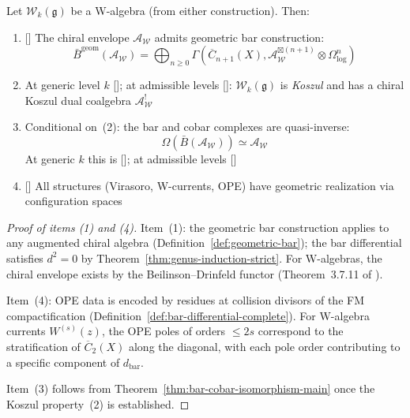 \begin{conjecture}\label{conj:w-algebra-bar-cobar}
Let $\mathcal{W}_k(\mathfrak{g})$ be a W-algebra (from either construction). Then:
\begin{enumerate}
\item \textup{[\ClaimStatusProvedHere]}
The chiral envelope $\mathcal{A}_{\mathcal{W}}$ admits geometric bar
      construction:
      \[\bar{B}^{\text{geom}}(\mathcal{A}_{\mathcal{W}}) = \bigoplus_{n \geq 0}
      \Gamma\left(\overline{C}_{n+1}(X), \mathcal{A}_{\mathcal{W}}^{\boxtimes(n+1)}
      \otimes \Omega^n_{\log}\right)\]

\item At generic level $k$ \textup{[\ClaimStatusProvedHere]};
      at admissible levels \textup{[\ClaimStatusConjectured]}:
      $\mathcal{W}_k(\mathfrak{g})$ is \emph{Koszul} and has a chiral
      Koszul dual coalgebra $\mathcal{A}_{\mathcal{W}}^!$

\item Conditional on~\textup{(2)}: the bar and cobar complexes are quasi-inverse:
      \[\Omega(\bar{B}(\mathcal{A}_{\mathcal{W}})) \simeq \mathcal{A}_{\mathcal{W}}\]
      At generic $k$ this is \textup{[\ClaimStatusProvedHere]};
      at admissible levels \textup{[\ClaimStatusConjectured]}

\item \textup{[\ClaimStatusProvedHere]}
All structures (Virasoro, W-currents, OPE) have geometric realization via
      configuration spaces
\end{enumerate}
\end{conjecture}

\begin{proof}[Proof of items \textup{(1)} and \textup{(4)}]
Item~(1): the geometric bar construction applies to any augmented chiral algebra
(Definition~\ref{def:geometric-bar}); the bar differential satisfies
$d^2 = 0$ by Theorem~\ref{thm:genus-induction-strict}.  For W-algebras,
the chiral envelope exists by the Beilinson--Drinfeld functor
(Theorem~3.7.11 of \cite{BD04}).

Item~(4): OPE data is encoded by residues at collision divisors of the
FM compactification (Definition~\ref{def:bar-differential-complete}).
For W-algebra currents $W^{(s)}(z)$, the OPE poles of orders
$\leq 2s$ correspond to the stratification of $\overline{C}_2(X)$
along the diagonal, with each pole order contributing to a specific
component of $d_{\mathrm{bar}}$.

Item~(3) follows from
Theorem~\ref{thm:bar-cobar-isomorphism-main} once the Koszul property~(2)
is established.
\end{proof}

